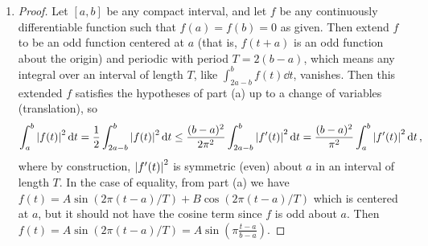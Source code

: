 \documentclass[11pt]{article}
\newcommand{\br}[1]{\left(#1\right)}
\begin{document}
\begin{enumerate}[label=(\alph*)]
\begin{proof}
\begin{align*}
        &\leq \br{T\sum_{n\neq 0}\abs{a_n}^2}\br{T\sum_{n\neq 0}\abs{b_n}^2}\\
        &\leq \br{T\sum_{n=-\infty}^{\infty}\abs{a_n}^2}\br{\frac{T^3}{4\pi^2}\sum_{n\neq 0}\abs{c_n}^2 + Tc_0}\\
        &\leq \int_0^T \abs{f(t)}^2\dd{t} \br{\frac{T^3}{4\pi^2}\sum_{n = -\infty}^{\infty}\abs{c_n}^2}\\
        &= \frac{T^2}{4\pi^2}\int_0^T \abs{f(t)}^2\dd{t}\int_0^T \abs{g^{\prime}(t)}^2\dd{t},
      \end{align*} so $\abs{\int_0^T \overline{f(t)}g(t)\dd{t}}^2\leq \frac{T^2}{4\pi^2}\int_0^T \abs{f(t)}^2\dd{t}\int_0^T \abs{g^{\prime}(t)}^2\dd{t}$ as desired.
    \end{proof}
    \item \begin{proof}
      Let $[a,b]$ be any compact interval, and let $f$ be any continuously differentiable function such that $f(a) = f(b) = 0$ as given. Then extend $f$ to be an odd function centered at $a$ (that is, $f(t+a)$ is an odd function about the origin) and periodic with period $T = 2(b-a)$, which means any integral over an interval of length $T$, like $\int_{2a-b}^{b}f(t)\dd{t} $, vanishes. Then this extended $f$ satisfies the hypotheses of part (a) up to a change of variables (translation), so
      \begin{align*}
        \int_a^b \abs{f(t)}^2\dd{t} = \frac{1}{2}\int_{2a-b}^b \abs{f(t)}^2\dd{t} \leq \frac{(b-a)^2}{2\pi^2}\int_{2a-b}^b \abs{f^{\prime}(t)}^2\dd{t} = \frac{(b-a)^2}{\pi^2}\int_a^b \abs{f^{\prime}(t)}^2\dd{t},
      \end{align*} where by construction, $\abs{f^{\prime}(t)}^2$ is symmetric (even) about $a$ in an interval of length $T$. In the case of equality, from part (a) we have $f(t) = A\sin(2\pi (t-a)/T) + B\cos(2\pi (t-a)/T)$ which is centered at $a$, but it should not have the cosine term since $f$ is odd about $a$. Then $f(t) = A\sin(2\pi (t-a)/T) = A\sin(\pi \frac{t-a}{b-a})$.
    \end{proof}
\end{enumerate}
\end{document}
